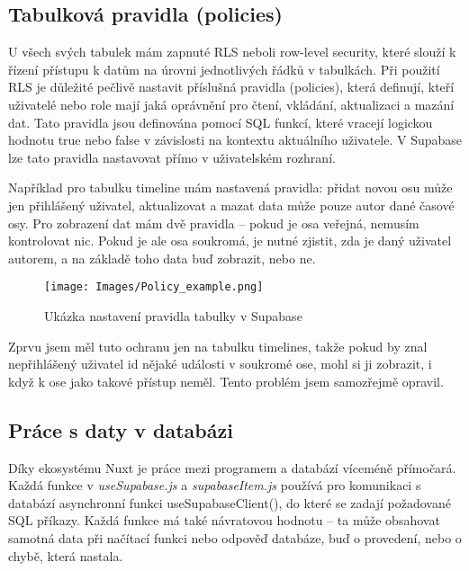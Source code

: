 \subsection{Tabulková pravidla (policies)}
\label{policies}
U všech svých tabulek mám zapnuté RLS neboli row-level security, které slouží k řízení přístupu k datům na úrovni jednotlivých řádků v tabulkách. Při použití RLS je důležité pečlivě nastavit příslušná pravidla (policies), která definují, kteří uživatelé nebo role mají jaká oprávnění pro čtení, vkládání, aktualizaci a mazání dat. Tato pravidla jsou definována pomocí SQL funkcí, které vracejí logickou hodnotu true nebo false v závislosti na kontextu aktuálního uživatele. V Supabase lze tato pravidla nastavovat přímo v uživatelském rozhraní. 

Například pro tabulku timeline mám nastavená pravidla: přidat novou osu může jen přihlášený uživatel, aktualizovat a mazat data může pouze autor dané časové osy. Pro zobrazení dat mám dvě pravidla – pokud je osa veřejná, nemusím kontrolovat nic. Pokud je ale osa soukromá, je nutné zjistit, zda je daný uživatel autorem, a na základě toho data buď zobrazit, nebo ne.


\begin{figure}[h]
    \centering
    \texttt{[image: Images/Policy\_example.png]}
    \caption{Ukázka nastavení pravidla tabulky v Supabase}
    \label{fig:Policy example}
\end{figure}

Zprvu jsem měl tuto ochranu jen na tabulku timelines, takže pokud by znal nepřihlášený uživatel id nějaké události v soukromé ose, mohl si ji zobrazit, i když k ose jako takové přístup neměl. Tento problém jsem samozřejmě opravil.

\newpage

\subsection{Práce s daty v databázi}
Díky ekosystému Nuxt je práce mezi programem a databází víceméně přímočará. Každá funkce v \textit{useSupabase.js} a \textit{supabaseItem.js} používá pro komunikaci s databází asynchronní funkci useSupabaseClient(), do které se zadají požadované SQL příkazy. Každá funkce má také návratovou hodnotu – ta může obsahovat samotná data při načítací funkci nebo odpověď databáze, buď o provedení, nebo o chybě, která nastala.

